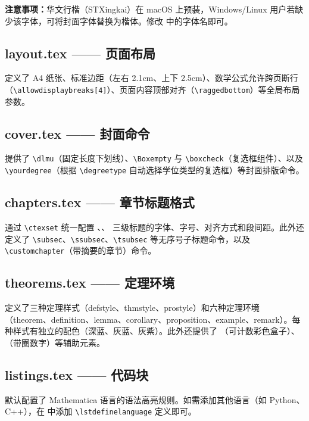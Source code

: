 \documentclass[../main-manual.tex]{subfiles}
\begin{document}
\textbf{注意事项：}华文行楷（STXingkai）在 macOS 上预装，Windows/Linux 用户若缺少该字体，可将封面字体替换为楷体。修改  中的字体名即可。

\subsection{layout.tex —— 页面布局}

定义了 A4 纸张、标准边距（左右 2.1cm、上下 2.5cm）、数学公式允许跨页断行（\verb|\allowdisplaybreaks[4]|）、页面内容顶部对齐（\verb|\raggedbottom|）等全局布局参数。

\subsection{cover.tex —— 封面命令}

提供了 \verb|\dlmu|（固定长度下划线）、\verb|\Boxempty| 与 \verb|\boxcheck|（复选框组件）、以及 \verb|\yourdegree|（根据 \verb|\degreetype| 自动选择学位类型的复选框）等封面排版命令。

\subsection{chapters.tex —— 章节标题格式}

通过 \verb|\ctexset| 统一配置 、、 三级标题的字体、字号、对齐方式和段间距。此外还定义了 \verb|\subsec|、\verb|\ssubsec|、\verb|\tsubsec| 等无序号子标题命令，以及 \verb|\customchapter|（带摘要的章节）命令。

\subsection{theorems.tex —— 定理环境}

定义了三种定理样式（defstyle、thmstyle、prostyle）和六种定理环境（theorem、definition、lemma、corollary、proposition、example、remark）。每种样式有独立的配色（深蓝、灰蓝、灰紫）。此外还提供了 （可计数彩色盒子）、（带圈数字）等辅助元素。

\subsection{listings.tex —— 代码块}

默认配置了 Mathematica 语言的语法高亮规则。如需添加其他语言（如 Python、C++），在  中添加 \verb|\lstdefinelanguage| 定义即可。
\end{document}
